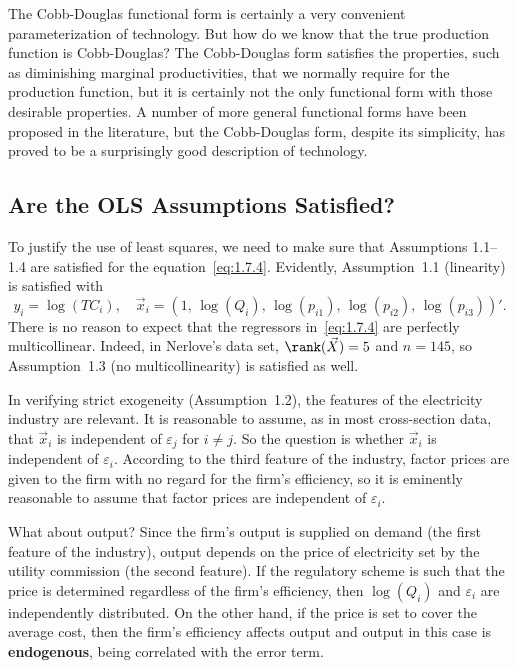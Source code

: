 The Cobb-Douglas functional form is certainly a very convenient parameterization of
technology.  But how do we know that the true production function is Cobb-Douglas?
The Cobb-Douglas form satisfies the properties, such as diminishing marginal
productivities, that we normally require for the production function, but it is
certainly not the only functional form with those desirable properties.  A number of
more general functional forms have been proposed in the literature, but the
Cobb-Douglas form, despite its simplicity, has proved to be a surprisingly good
description of technology.

\subsection*{Are the OLS Assumptions Satisfied?}

To justify the use of least squares, we need to make sure that Assumptions 1.1--1.4
are satisfied for the equation~\eqref{eq:1.7.4}.  Evidently, Assumption~1.1 (linearity)
is satisfied with
\[
  y_i = \log(TC_i), \quad
  \vec{x}_i = (1,\, \log(Q_i),\, \log(p_{i1}),\, \log(p_{i2}),\, \log(p_{i3}))'.
\]
There is no reason to expect that the regressors in~\eqref{eq:1.7.4} are perfectly
multicollinear.  Indeed, in Nerlove's data set, $\rank(\vec{X}) = 5$ and $n = 145$,
so Assumption~1.3 (no multicollinearity) is satisfied as well.

In verifying strict exogeneity (Assumption~1.2), the features of the electricity
industry are relevant.  It is reasonable to assume, as in most cross-section data, that
$\vec{x}_i$ is independent of $\varepsilon_j$ for $i \neq j$.  So the question is
whether $\vec{x}_i$ is independent of $\varepsilon_i$.  According to the third feature
of the industry, factor prices are given to the firm with no regard for the firm's
efficiency, so it is eminently reasonable to assume that factor prices are independent
of $\varepsilon_i$.

What about output?  Since the firm's output is supplied on demand (the first feature of
the industry), output depends on the price of electricity set by the utility commission
(the second feature).  If the regulatory scheme is such that the price is determined
regardless of the firm's efficiency, then $\log(Q_i)$ and $\varepsilon_i$ are
independently distributed.  On the other hand, if the price is set to cover the average
cost, then the firm's efficiency affects output and output in this case is
\textbf{endogenous}, being correlated with the error term.

